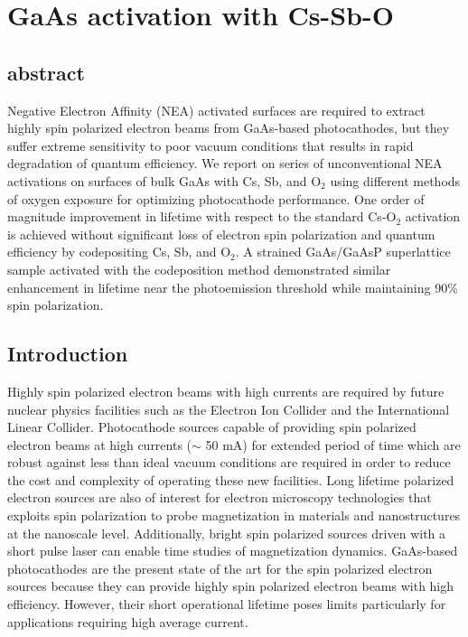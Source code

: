 \chapter{G\lowercase{a}A\lowercase{s} activation with C\lowercase{s}-S\lowercase{b}-O}

\section{abstract}
Negative Electron Affinity (NEA) activated surfaces are required to extract highly spin polarized electron beams from GaAs-based photocathodes, but they suffer extreme sensitivity to poor vacuum conditions that results in rapid degradation of quantum efficiency. We report on series of unconventional NEA activations on surfaces of bulk GaAs with Cs, Sb, and O$_2$ using different methods of oxygen exposure for optimizing photocathode performance. One order of magnitude improvement in lifetime with respect to the standard Cs-O$_2$ activation is achieved without significant loss of electron spin polarization and quantum efficiency by codepositing Cs, Sb, and O$_2$. A strained GaAs/GaAsP superlattice sample activated with the codeposition method demonstrated similar enhancement in lifetime near the photoemission threshold while maintaining 90\% spin polarization.

\section{Introduction}
Highly spin polarized electron beams with high currents are required by future nuclear physics facilities such as the Electron Ion Collider and the International Linear Collider.\cite{eic,lrpns,nsac} Photocathode sources capable of providing spin polarized electron beams at high currents ($\sim$ 50 mA)\cite{NASreport} for extended period of time which are robust against less than ideal vacuum conditions are required in order to reduce the cost and complexity of operating these new facilities. Long lifetime polarized electron sources are also of interest for electron microscopy technologies that exploits spin polarization to probe magnetization in materials and nanostructures at the nanoscale level. Additionally, bright spin polarized sources driven with a short pulse laser can enable time studies of magnetization dynamics.\cite{suzuki2010_RealTimeMagnetic, kuwahara2012_30kVSpinpolarizedTransmission,vollmer2003}
GaAs-based photocathodes are the present state of the art for the spin polarized electron sources because they can provide highly spin polarized electron beams with high efficiency.\cite{liu2016_RecordlevelQuantumEfficiency} However, their short operational lifetime poses limits particularly for applications requiring high average current.\cite{cardman2018}


